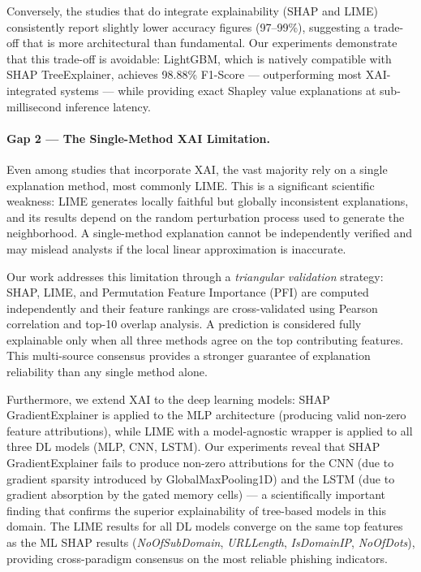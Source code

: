 Conversely, the studies that do integrate explainability (SHAP and LIME) consistently report slightly lower accuracy figures (97--99\%), suggesting a trade-off that is more architectural than fundamental. Our experiments demonstrate that this trade-off is avoidable: LightGBM, which is natively compatible with SHAP TreeExplainer, achieves 98.88\% F1-Score — outperforming most XAI-integrated systems — while providing exact Shapley value explanations at sub-millisecond inference latency.

\paragraph{Gap 2 — The Single-Method XAI Limitation.}
Even among studies that incorporate XAI, the vast majority rely on a single explanation method, most commonly LIME. This is a significant scientific weakness: LIME generates locally faithful but globally inconsistent explanations, and its results depend on the random perturbation process used to generate the neighborhood. A single-method explanation cannot be independently verified and may mislead analysts if the local linear approximation is inaccurate.

Our work addresses this limitation through a \textit{triangular validation} strategy: SHAP, LIME, and Permutation Feature Importance (PFI) are computed independently and their feature rankings are cross-validated using Pearson correlation and top-10 overlap analysis. A prediction is considered fully explainable only when all three methods agree on the top contributing features. This multi-source consensus provides a stronger guarantee of explanation reliability than any single method alone.

Furthermore, we extend XAI to the deep learning models: SHAP GradientExplainer is applied to the MLP architecture (producing valid non-zero feature attributions), while LIME with a model-agnostic wrapper is applied to all three DL models (MLP, CNN, LSTM). Our experiments reveal that SHAP GradientExplainer fails to produce non-zero attributions for the CNN (due to gradient sparsity introduced by GlobalMaxPooling1D) and the LSTM (due to gradient absorption by the gated memory cells) — a scientifically important finding that confirms the superior explainability of tree-based models in this domain. The LIME results for all DL models converge on the same top features as the ML SHAP results (\textit{NoOfSubDomain}, \textit{URLLength}, \textit{IsDomainIP}, \textit{NoOfDots}), providing cross-paradigm consensus on the most reliable phishing indicators.

